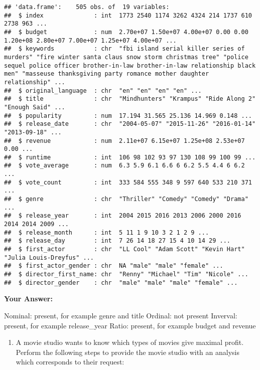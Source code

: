 \documentclass[
]{article}
\providecommand{\tightlist}{%
  \setlength{\itemsep}{0pt}\setlength{\parskip}{0pt}}
\begin{document}
\begin{verbatim}
## 'data.frame':    505 obs. of  19 variables:
##  $ index              : int  1773 2540 1174 3262 4324 214 1737 610 2738 963 ...
##  $ budget             : num  2.70e+07 1.50e+07 4.00e+07 0.00 0.00 1.20e+08 2.80e+07 7.00e+07 1.25e+07 4.00e+07 ...
##  $ keywords           : chr  "fbi island serial killer series of murders" "fire winter santa claus snow storm christmas tree" "police sequel police officer brother-in-law brother-in-law relationship black men" "masseuse thanksgiving party romance mother daughter relationship" ...
##  $ original_language  : chr  "en" "en" "en" "en" ...
##  $ title              : chr  "Mindhunters" "Krampus" "Ride Along 2" "Enough Said" ...
##  $ popularity         : num  17.194 31.565 25.136 14.969 0.148 ...
##  $ release_date       : chr  "2004-05-07" "2015-11-26" "2016-01-14" "2013-09-18" ...
##  $ revenue            : num  2.11e+07 6.15e+07 1.25e+08 2.53e+07 0.00 ...
##  $ runtime            : int  106 98 102 93 97 130 108 99 100 99 ...
##  $ vote_average       : num  6.3 5.9 6.1 6.6 6 6.2 5.5 4.4 6 6.2 ...
##  $ vote_count         : int  333 584 555 348 9 597 640 533 210 371 ...
##  $ genre              : chr  "Thriller" "Comedy" "Comedy" "Drama" ...
##  $ release_year       : int  2004 2015 2016 2013 2006 2000 2016 2014 2014 2009 ...
##  $ release_month      : int  5 11 1 9 10 3 2 1 2 9 ...
##  $ release_day        : int  7 26 14 18 27 15 4 10 14 29 ...
##  $ first_actor        : chr  "LL Cool" "Adam Scott" "Kevin Hart" "Julia Louis-Dreyfus" ...
##  $ first_actor_gender : chr  NA "male" "male" "female" ...
##  $ director_first_name: chr  "Renny" "Michael" "Tim" "Nicole" ...
##  $ director_gender    : chr  "male" "male" "male" "female" ...
\end{verbatim}

\textbf{Your Answer:}

Nominal: present, for example genre and title Ordinal: not present
Inverval: present, for example release\_year Ratio: present, for example
budget and revenue

\begin{enumerate}
\def\labelenumi{\arabic{enumi}.}
\setcounter{enumi}{2}
\tightlist
\item
  A movie studio wants to know which types of movies give maximal
  profit. Perform the following steps to provide the movie studio with
  an analysis which corresponds to their request:
\end{enumerate}
\end{document}
